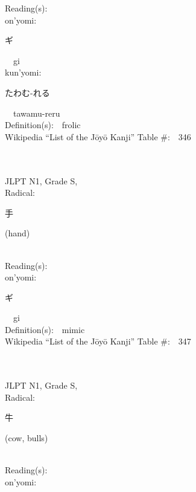 \begin{multicols}{2}
Reading(s):\ \ \\
{\hspace*{1em}}on'yomi:\ \ \\
{\hspace*{2em}}{\begin{CJK}{UTF8}{min} ギ \end{CJK}}\ \ gi\ \ \\
{\hspace*{1em}}kun'yomi:\ \ \\
{\hspace*{2em}}{\begin{CJK}{UTF8}{min} たわむ-れる \end{CJK}}\ \ tawamu-reru\ \ \\
Definition(s):\ \ frolic \\
Wikipedia ``List of the J\=oy\=o Kanji'' Table \#:\ \ 346 \\
\ \ \\
{\fontsize{34pt}{40pt}  }\ \ \\
{JLPT N1, Grade S, \\Radical:\ \ {\begin{CJK}{UTF8}{min} 手 \end{CJK}} (hand) } \\
Reading(s):\ \ \\
{\hspace*{1em}}on'yomi:\ \ \\
{\hspace*{2em}}{\begin{CJK}{UTF8}{min} ギ \end{CJK}}\ \ gi\ \ \\
Definition(s):\ \ mimic \\
Wikipedia ``List of the J\=oy\=o Kanji'' Table \#:\ \ 347 \\
\ \ \\
{\fontsize{34pt}{40pt}  }\ \ \\
{JLPT N1, Grade S, \\Radical:\ \ {\begin{CJK}{UTF8}{min} 牛 \end{CJK}} (cow, bulls) } \\
Reading(s):\ \ \\
{\hspace*{1em}}on'yomi:\ \ \\

\end{multicols}
